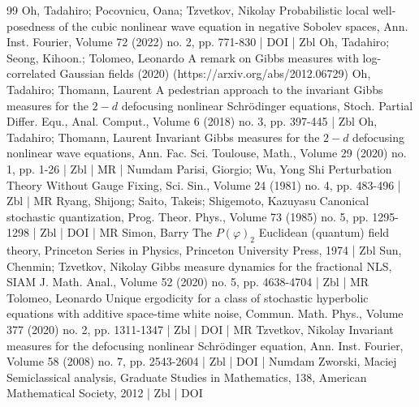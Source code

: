 \documentclass[10pt]{amsart}
\theoremstyle{definition}\newtheorem{defi}[theo]{Definition}\newtheorem{rema}[theo]{Remark}\newtheorem{exam}[theo]{Example}\newtheorem{exem}[theo]{Example}\newtheorem{nota}[theo]{Notation}
\begin{document}
\begin{thebibliography}{99}
 Oh, Tadahiro; Pocovnicu, Oana; Tzvetkov, Nikolay Probabilistic local well-posedness of the cubic nonlinear wave equation in negative Sobolev spaces, Ann. Inst. Fourier, Volume 72 (2022) no. 2, pp. 771-830 | DOI | Zbl
 Oh, Tadahiro; Seong, Kihoon.; Tolomeo, Leonardo A remark on Gibbs measures with log-correlated Gaussian fields (2020) (https://arxiv.org/abs/2012.06729)
 Oh, Tadahiro; Thomann, Laurent A pedestrian approach to the invariant Gibbs measures for the $2-d$ defocusing nonlinear Schrödinger equations, Stoch. Partial Differ. Equ., Anal. Comput., Volume 6 (2018) no. 3, pp. 397-445 | Zbl
 Oh, Tadahiro; Thomann, Laurent Invariant Gibbs measures for the $2-d$ defocusing nonlinear wave equations, Ann. Fac. Sci. Toulouse, Math., Volume 29 (2020) no. 1, pp. 1-26 | Zbl | MR | Numdam
 Parisi, Giorgio; Wu, Yong Shi Perturbation Theory Without Gauge Fixing, Sci. Sin., Volume 24 (1981) no. 4, pp. 483-496 | Zbl | MR
 Ryang, Shijong; Saito, Takeis; Shigemoto, Kazuyasu Canonical stochastic quantization, Prog. Theor. Phys., Volume 73 (1985) no. 5, pp. 1295-1298 | Zbl | DOI | MR
 Simon, Barry The ${P}(\varphi )_{2}$ Euclidean (quantum) field theory, Princeton Series in Physics, Princeton University Press, 1974 | Zbl
 Sun, Chenmin; Tzvetkov, Nikolay Gibbs measure dynamics for the fractional NLS, SIAM J. Math. Anal., Volume 52 (2020) no. 5, pp. 4638-4704 | Zbl | MR
 Tolomeo, Leonardo Unique ergodicity for a class of stochastic hyperbolic equations with additive space-time white noise, Commun. Math. Phys., Volume 377 (2020) no. 2, pp. 1311-1347 | Zbl | DOI | MR
 Tzvetkov, Nikolay Invariant measures for the defocusing nonlinear Schrödinger equation, Ann. Inst. Fourier, Volume 58 (2008) no. 7, pp. 2543-2604 | Zbl | DOI | Numdam
 Zworski, Maciej Semiclassical analysis, Graduate Studies in Mathematics, 138, American Mathematical Society, 2012 | Zbl | DOI
\end{thebibliography}
\end{document}
